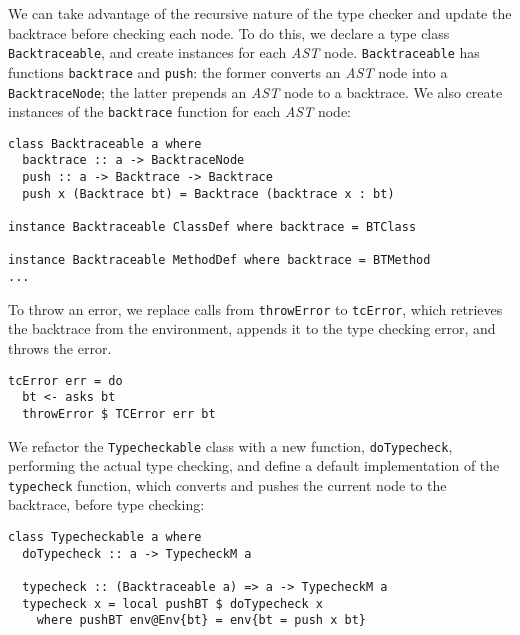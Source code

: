 \documentclass[sigplan,screen]{acmart}
\makeatletter
\newcommand{\ec}[1]{\lstinline[style=encore,breaklines=true,basicstyle=\fontsize{9}{9}\tt]@#1@}
\newcommand{\astt}[0]{\textit{AST}}
\makeatother
\begin{document}
We can take advantage of the recursive nature of the type checker
and update the backtrace before checking each node.
To do this, we declare a type class
\ec{Backtraceable}, and create instances for each \astt{} node.
\ec{Backtraceable} has functions
 \ec{backtrace} and \ec{push}: the
former converts an \astt{} node into a \ec{BacktraceNode}; the latter
prepends an \astt{} node to a backtrace.
We also create instances of the \ec{backtrace} function for each \astt{} node:

\begin{minipage}[t]{\linewidth}
\begin{lstlisting}[style=encore]
class Backtraceable a where
  backtrace :: a -> BacktraceNode
  push :: a -> Backtrace -> Backtrace
  push x (Backtrace bt) = Backtrace (backtrace x : bt)

instance Backtraceable ClassDef where backtrace = BTClass

instance Backtraceable MethodDef where backtrace = BTMethod
...
\end{lstlisting}
\end{minipage}

To throw an error, we replace calls from \ec{throwError} to
\ec{tcError}, which retrieves the backtrace from the
environment, appends it to the type checking error, and throws the error.

\begin{minipage}[t]{\linewidth}
\begin{lstlisting}[style=encore]
tcError err = do
  bt <- asks bt
  throwError $ TCError err bt
\end{lstlisting}
\end{minipage}

\begin{sloppypar}
We refactor the \ec{Typecheckable} class with a new
function, \ec{doTypecheck}, performing the actual type checking,
and define a default implementation of the \ec{typecheck} function,
which converts and pushes the current node to the backtrace,
before type checking:
\end{sloppypar}

\begin{minipage}[t]{\linewidth}
\begin{lstlisting}[style=encore]
class Typecheckable a where
  doTypecheck :: a -> TypecheckM a

  typecheck :: (Backtraceable a) => a -> TypecheckM a
  typecheck x = local pushBT $ doTypecheck x
    where pushBT env@Env{bt} = env{bt = push x bt}
\end{lstlisting}
\end{minipage}
\end{document}
